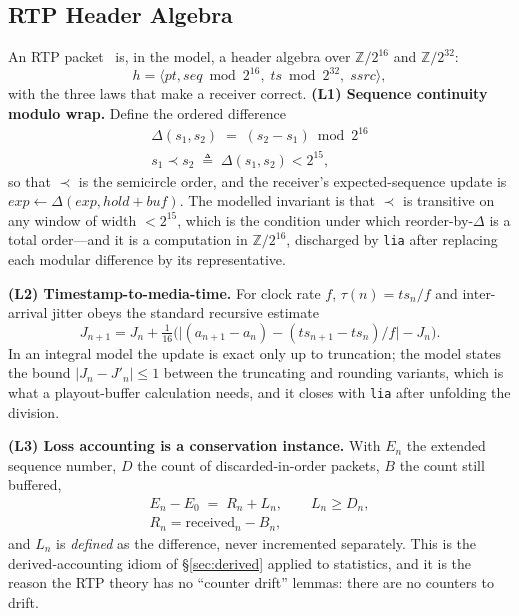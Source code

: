 \documentclass[10pt,journal,compsoc,twocolumn]{article}
\theoremstyle{definition}
\theoremstyle{remark}
\theoremstyle{plain}
\newcommand{\ctr}[1]{\texttt{#1}}
\begin{document}
\subsection{RTP Header Algebra}
An RTP packet~\cite{rfc3550} is, in the model, a header algebra over \(\mathbb{Z}/2^{16}\) and \(\mathbb{Z}/2^{32}\):
\begin{equation}
h = \langle \mathit{pt}, \mathit{seq} \bmod 2^{16},\; \mathit{ts} \bmod 2^{32},\; \mathit{ssrc} \rangle ,
\end{equation}
with the three laws that make a receiver correct.
\textbf{(L1) Sequence continuity modulo wrap.} Define the ordered difference
\begin{equation}
\begin{gathered}
\Delta(s_1, s_2) \;=\; (s_2 - s_1) \bmod 2^{16} \\
s_1 \prec s_2 \;\triangleq\; \Delta(s_1,s_2) < 2^{15},
\end{gathered}
\end{equation}
so that \(\prec\) is the semicircle order, and the receiver's expected-sequence update is \(\mathit{exp} \leftarrow \Delta(\mathit{exp}, \mathit{hold} + \mathit{buf})\). The modelled invariant is that \(\prec\) is transitive on any window of width \(<2^{15}\), which is the condition under which reorder-by-\(\Delta\) is a total order---and it is a computation in \(\mathbb{Z}/2^{16}\), discharged by \ctr{lia} after replacing each modular difference by its representative.

\textbf{(L2) Timestamp-to-media-time.} For clock rate \(f\), \(\tau(n) = \mathit{ts}_n / f\) and inter-arrival jitter obeys the standard recursive estimate
\begin{equation}
\label{eq:jitter}
J_{n+1} = J_n + \tfrac{1}{16}\Big(\big|(\mathit{a}_{n+1}-\mathit{a}_n) - (\mathit{ts}_{n+1}-\mathit{ts}_n)/f\big| - J_n\Big).
\end{equation}
In an integral model the update is exact only up to truncation; the model states the bound
\(|J_{n} - J'_{n}| \le 1\) between the truncating and rounding variants, which is what a playout-buffer calculation needs, and it closes with \ctr{lia} after unfolding the division.

\textbf{(L3) Loss accounting is a conservation instance.} With \(E_n\) the extended sequence number, \(D\) the count of discarded-in-order packets, \(B\) the count still buffered,
\begin{equation}
\label{eq:rtpcons}
\begin{gathered}
E_n - E_0 \;=\; R_n + L_n, \qquad L_n \ge D_n, \\
R_n = \text{received}_n - B_n,
\end{gathered}
\end{equation}
and \(L_n\) is \emph{defined} as the difference, never incremented separately. This is the derived-accounting idiom of \S\ref{sec:derived} applied to statistics, and it is the reason the RTP theory has no ``counter drift'' lemmas: there are no counters to drift.
\end{document}
